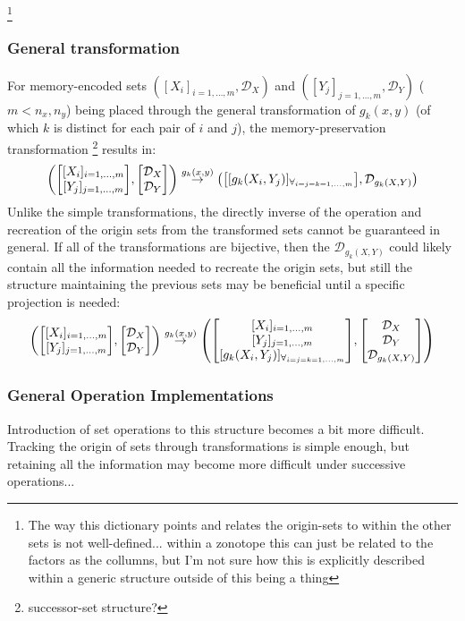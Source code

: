 \documentclass[11pt]{article}
\newcommand{\Dict}{\mathcal{D}} %
\begin{document}
\footnote{
	The way this dictionary points and relates the origin-sets to within the other sets is not well-defined...
	within a zonotope this can just be related to the factors as the collumns, but I'm not sure how this is explicitly described within a generic structure outside of this being a thing
}

\subsubsection{General transformation}
For memory-encoded sets $([X_{i}]_{i=1,\dots,m}, \Dict_{X})$ and $([Y_{j}]_{j=1,\dots,m}, \Dict_{Y})$ ($m < n_x,n_y$) being placed through the general transformation of $g_{k}(x,y)$ (of which $k$ is distinct for each pair of $i$ and $j$), the memory-preservation transformation \footnote{successor-set structure?} results in:
\[
	\qty(
		\mqty[
			[X_{i}]_{i=1,\dots,m}\\
			[Y_{j}]_{j=1,\dots,m}
		],
		\mqty[\Dict_{X}\\ \Dict_{Y}]
	)
	\overset{g_k(x,y)}{\to}
	\qty(
		\mqty[[g_k(X_{i},Y_{j})]_{\forall_{i=j=k=1,\dots,m}}],
		\Dict_{g_k(X,Y)}
	)
\]
Unlike the simple transformations, the directly inverse of the operation and recreation of the origin sets from the transformed sets cannot be guaranteed in general.
If all of the transformations are bijective, then the $\Dict_{g_k(X,Y)}$ could likely contain all the information needed to recreate the origin sets, but still the structure maintaining the previous sets may be beneficial until a specific projection is needed:
\[
	\qty(
		\mqty[
			[X_{i}]_{i=1,\dots,m}\\
			[Y_{j}]_{j=1,\dots,m}
		],
		\mqty[\Dict_{X}\\ \Dict_{Y}]
	)
	\overset{g_k(x,y)}{\to}
	\qty(
		\mqty[
			[X_{i}]_{i=1,\dots,m}\\
			[Y_{j}]_{j=1,\dots,m}\\
			[g_k(X_{i},Y_{j})]_{\forall_{i=j=k=1,\dots,m}}
		],
		\mqty[
			\Dict_{X}\\ 
			\Dict_{Y}\\ 
			\Dict_{g_k(X,Y)}
		]
	)
\]

\subsubsection{General Operation Implementations} \label{sec:gen_op_implimentation}
Introduction of set operations to this structure becomes a bit more difficult.
Tracking the origin of sets through transformations is simple enough, but retaining all the information may become more difficult under successive operations...
\end{document}
